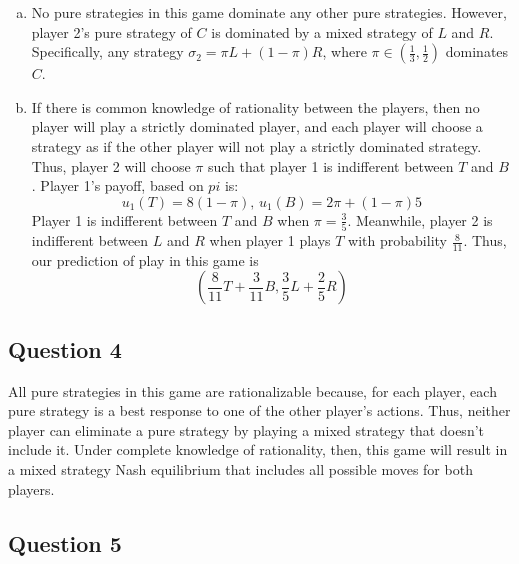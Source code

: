 \documentclass{article}
\begin{document}
\begin{enumerate}[(a)]
	\item No pure strategies in this game dominate any other pure strategies. However, player 2's pure strategy of $C$ is dominated by a mixed strategy of $L$ and $R$. Specifically, any strategy $\sigma_2=\pi L + (1-\pi)R$, where $\pi\in(\frac{1}{3},\frac{1}{2})$ dominates $C$.
	
	\item If there is common knowledge of rationality between the players, then no player will play a strictly dominated player, and each player will choose a strategy as if the other player will not play a strictly dominated strategy. Thus, player 2 will choose $\pi$ such that player 1 is indifferent between $T$ and $B$. Player 1's payoff, based on $pi$ is:
		\[
			u_1(T) = 8(1-\pi)\text{, } u_1(B) = 2\pi + (1-\pi)5
		\]
		Player 1 is indifferent between $T$ and $B$ when $\pi = \frac{3}{5}$. Meanwhile, player 2 is indifferent between $L$ and $R$ when player 1 plays $T$ with probability $\frac{8}{11}$. Thus, our prediction of play in this game is
		\[
			\left(\frac{8}{11}T + \frac{3}{11}B, \frac{3}{5}L + \frac{2}{5}R\right)
		\]
\end{enumerate}


\subsection*{Question 4}
All pure strategies in this game are rationalizable because, for each player, each pure strategy is a best response to one of the other player's actions. Thus, neither player can eliminate a pure strategy by playing a mixed strategy that doesn't include it. Under complete knowledge of rationality, then, this game will result in a mixed strategy Nash equilibrium that includes all possible moves for both players.

\pagebreak
\subsection*{Question 5}
\end{document}
